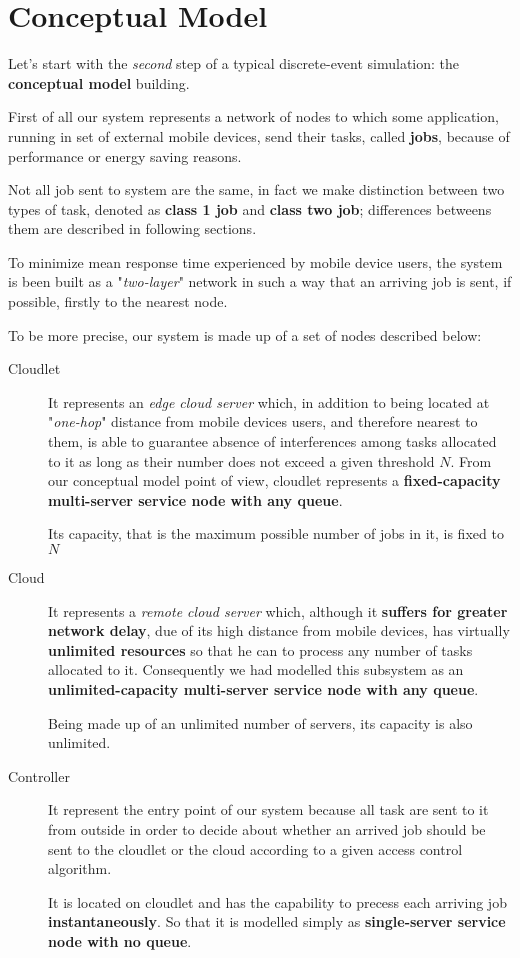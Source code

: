 \documentclass[10pt,a4paper]{article}
\begin{document}
\section{Conceptual Model}

Let's start with the \textit{second} step of a typical discrete-event simulation: the \textbf{conceptual model} building. 

First of all our system represents a network of nodes to which some application, running in set of external mobile devices, send their tasks, called \textbf{jobs}, because of performance or energy saving reasons. 

Not all job sent to system are the same, in fact we make distinction between two types of task, denoted as \textbf{class 1 job} and \textbf{class two job}; differences betweens them are described in following sections. 

To minimize mean response time experienced by mobile device users, the system is been built as a "\textit{two-layer}" network in such a way that an arriving job is sent, if possible, firstly to the nearest node.

To be more precise, our system is made up of a set of nodes described below:

\begin{description}
\item[Cloudlet] It represents an \textit{edge cloud server} which, in addition to being located at "\textit{one-hop}" distance from mobile devices users, and therefore nearest to them, is able to guarantee absence of interferences among tasks allocated to it as long as their number does not exceed a given threshold $N$. From our conceptual model point of view, cloudlet represents a \textbf{fixed-capacity multi-server service node with any queue}.

Its capacity, that is the maximum possible number of jobs in it, is fixed to $N$

\item[Cloud] It represents a \textit{remote cloud server} which, although it \textbf{suffers for greater network delay}, due of its high distance from mobile devices, has virtually \textbf{unlimited resources} so that he can to process any number of tasks allocated to it. Consequently we had modelled this subsystem as an \textbf{unlimited-capacity multi-server service node with any queue}.

Being made up of an unlimited number of servers, its capacity is also unlimited.

\item[Controller] It represent the entry point of our system because all task are sent to it from outside in order to decide about whether an arrived job should be sent to the cloudlet or the cloud according to a given access control algorithm.

It is located on cloudlet and has the capability to precess each arriving job \textbf{instantaneously}. So that it is modelled simply as \textbf{single-server service node with no queue}. 

\end{description}
\end{document}
